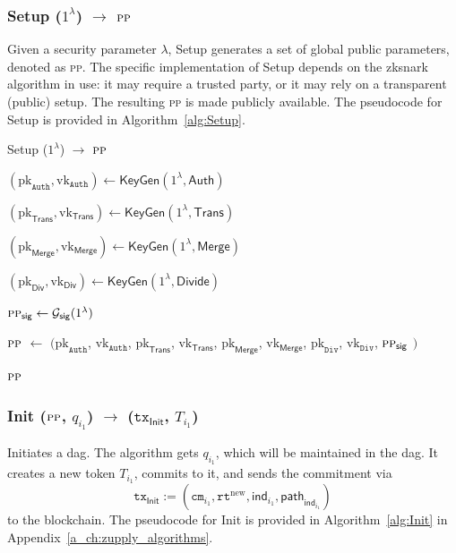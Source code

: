 \subsubsection{\textsf{Setup} ($1^{\lambda}$) $\rightarrow$ $\textsc{pp}$}
Given a security parameter $\lambda$, \textsf{Setup} generates a set of global public parameters, denoted as \textsc{pp}. The specific implementation of \textsf{Setup} depends on the \gls{zksnark} algorithm in use: it may require a trusted party, or it may rely on a transparent (public) setup. The resulting \textsc{pp} is made publicly available. The pseudocode for \textsf{Setup} is provided in Algorithm~\ref{alg:Setup}.

\begin{algorithm}[h]
\caption{\textsf{Setup} ($1^{\lambda}$) $\rightarrow$ $\textsc{pp}$ }\label{alg:Setup}
\begin{algorithmic}

\State $(\text{pk}_\texttt{Auth}, \text{vk}_\texttt{Auth}) \leftarrow \textsf{KeyGen}(1^{\lambda}, \mathsf{Auth})$ 

\State $(\text{pk}_\textsf{Trans}, \text{vk}_\textsf{Trans}) \leftarrow \textsf{KeyGen}(1^{\lambda}, \mathsf{Trans})$ 

\State $(\text{pk}_\textsf{Merge}, \text{vk}_\textsf{Merge}) \leftarrow \textsf{KeyGen}(1^{\lambda}, \mathsf{Merge})$ 

\State $(\text{pk}_\textsf{Div}, \text{vk}_\textsf{Div}) \leftarrow \textsf{KeyGen}(1^{\lambda}, \mathsf{Divide})$ 

\State $\textsc{pp}_\mathsf{sig} \leftarrow \mathcal{G}_\mathsf{sig}(1^{\lambda})$


\State $\textsc{pp}$ $\leftarrow$ $($$\text{pk}_\texttt{Auth}$, $\text{vk}_\texttt{Auth}$, $\text{pk}_\textsf{Trans}$, $\text{vk}_\textsf{Trans}$, $\text{pk}_\textsf{Merge}$, $\text{vk}_\textsf{Merge}$, $\text{pk}_\texttt{Div}$, $\text{vk}_\texttt{Div}$, $\textsc{pp}_\mathsf{sig}$ $)$

\State \Return $\textsc{pp}$

\end{algorithmic}
\end{algorithm}


\subsubsection{\textsf{Init} ($\textsc{pp}$, $q_{i_1}$) $\rightarrow$ ($\texttt{tx}_{\textsf{Init}}$, $T_{i_1}$) }
Initiates a \gls{dag}. The algorithm gets $q_{i_1}$, which will be maintained in the \gls{dag}. It creates a new token $T_{i_1}$, commits to it, and sends the commitment via
 \[
 \texttt{tx}_{\mathsf{Init}} := (\texttt{cm}_{i_1}, \texttt{rt}^{\text{new}}, \mathsf{ind}_{i_1}, \mathsf{path}_{\mathsf{ind}_{i_1}})
 \]
 to the blockchain. The pseudocode for \textsf{Init} is provided in Algorithm~\ref{alg:Init} in Appendix~\ref{a_ch:zupply_algorithms}.



